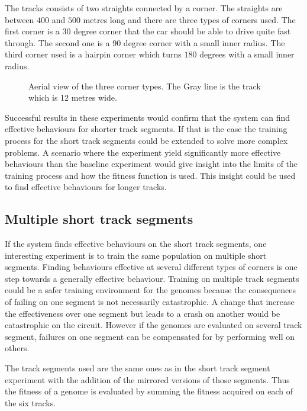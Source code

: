 The tracks consists of two straights connected by a corner. The straights are between $400$ and $500$ metres long and there are three types of corners used. The first corner is a $30$ degree corner that the car should be able to drive quite fast through. The second one is a $90$ degree corner with a small inner radius. The third corner used is a hairpin corner which turns $180$ degrees with a small inner radius. 
\begin{figure}[H]
    \centering
    \qquad
    \qquad

    \caption{Aerial view of the three corner types. The Gray line is the track which is 12 metres wide.}
\end{figure}
Successful results in these experiments would confirm that the system can find effective behaviours for shorter track segments. If that is the case the training process for the short track segments could be extended to solve more complex problems. A scenario where the experiment yield significantly more effective behaviours than the baseline experiment would give insight into the limits of the training process and how the fitness function is used. This insight could be used to find effective behaviours for longer tracks. 

\subsection{Multiple short track segments}

If the system finds effective behaviours on the short track segments, one interesting experiment is to train the same population on multiple short segments. Finding behaviours effective at several different types of corners is one step towards a generally effective behaviour. Training on multiple track segments could be a safer training environment for the genomes because the consequences of failing on one segment is not necessarily catastrophic. A change that increase the effectiveness over one segment but leads to a crash on another would be catastrophic on the circuit. However if the genomes are evaluated on several track segment, failures on one segment can be compensated for by performing well on others. 

The track segments used are the same ones as in the short track segment experiment with the addition of the mirrored versions of those segments. Thus the fitness of a genome is evaluated by summing the fitness acquired on each of the six tracks.

